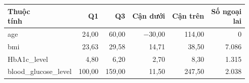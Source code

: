 \begin{tabular}{lrrrrr}
\toprule
\makecell[l]{Thuộc\\tính} & Q1 & Q3 & Cận dưới & Cận trên & \makecell[r]{Số ngoại\\lai} \\
\midrule
age & 24{,}00 & 60{,}00 & \ensuremath{-}30{,}00 & 114{,}00 & 0 \\
bmi & 23{,}63 & 29{,}58 & 14{,}71 & 38{,}50 & 7{.}086 \\
HbA1c\_level & 4{,}80 & 6{,}20 & 2{,}70 & 8{,}30 & 1{.}315 \\
blood\_glucose\_level & 100{,}00 & 159{,}00 & 11{,}50 & 247{,}50 & 2{.}038 \\
\bottomrule
\end{tabular}
